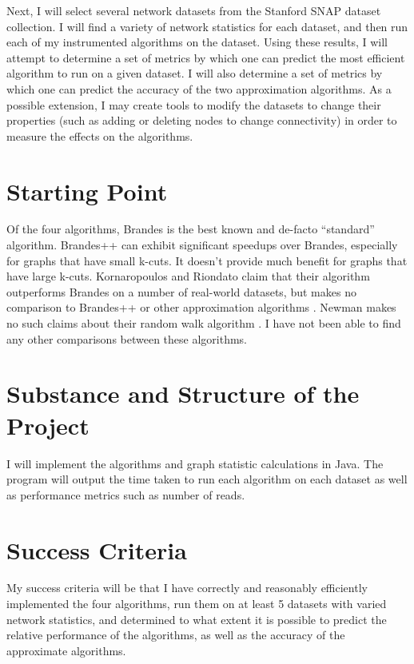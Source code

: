 \documentclass[a4paper,12pt]{article}
\begin{document}
Next, I will select several network datasets from the Stanford SNAP \cite{snapnets} dataset collection. I will find a variety of network statistics for each dataset, and then run each of my instrumented algorithms on the dataset. Using these results, I will attempt to determine a set of metrics by which one can predict the most efficient algorithm to run on a given dataset. I will also determine a set of metrics by which one can predict the accuracy of the two approximation algorithms. As a possible extension, I may create tools to modify the datasets to change their properties (such as adding or deleting nodes to change connectivity) in order to measure the effects on the algorithms.
\section{Starting Point}

Of the four algorithms, Brandes \cite{doi:10.1080/0022250X.2001.9990249} is the best known and de-facto ``standard'' algorithm. Brandes++ \cite{erdos2015divideandconquer} can exhibit significant speedups over Brandes, especially for graphs that have small k-cuts. It doesn't provide much benefit for graphs that have large k-cuts. Kornaropoulos and Riondato claim that their algorithm outperforms Brandes on a number of real-world datasets, but makes no comparison to Brandes++ or other approximation algorithms \cite{inproceedings}. Newman makes no such claims about their random walk algorithm \cite{NEWMAN200539}. I have not been able to find any other comparisons between these algorithms.
\section{Substance and Structure of the Project}

I will implement the algorithms and graph statistic calculations in Java. The program will output the time taken to run each algorithm on each dataset as well as performance metrics such as number of reads.

\section{Success Criteria}

My success criteria will be that I have correctly and reasonably efficiently implemented the four algorithms, run them on at least 5 datasets with varied network statistics, and determined to what extent it is possible to predict the relative performance of the algorithms, as well as the accuracy of the approximate algorithms.
\end{document}
